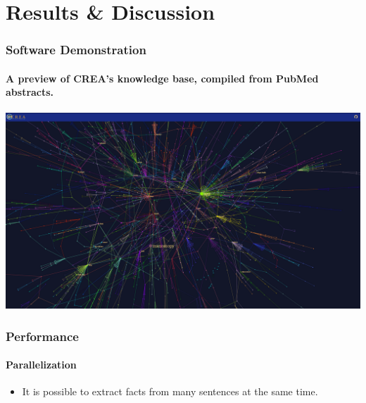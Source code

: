 \documentclass[mathserif]{beamer}
\begin{document}
\section{Results \& Discussion}

\begin{frame}

\frametitle{Software Demonstration}
\framesubtitle{A preview of CREA's knowledge base, compiled from
PubMed abstracts.}

\href{http://markfarrell.ca/creal}{\includegraphics[width=1.0\linewidth]{results.png}}

\end{frame}

\begin{frame}

\frametitle{Performance}
\framesubtitle{Parallelization}

\begin{itemize}[<+->]

\item It is possible to extract facts from many sentences at the same time.

\end{itemize}

\end{frame}
\end{document}
